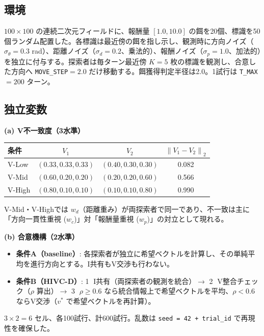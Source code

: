 \documentclass[11pt]{ltjsarticle}
\newcommand{\norm}[1]{\ensuremath{\lVert #1 \rVert}}
\begin{document}
\subsection{環境}

$100\times100$ の連続二次元フィールドに、報酬量 $[1.0, 10.0]$ の餌を20個、標識を50個ランダム配置した。各標識は最近傍の餌を指し示し、観測時に方向ノイズ（$\sigma_\theta=0.3$ rad）、距離ノイズ（$\sigma_d=0.2$、乗法的）、報酬ノイズ（$\sigma_p=1.0$、加法的）を独立に付与する。探索者は毎ターン最近傍 $K=5$ 枚の標識を観測し、合意した方向へ \texttt{MOVE\_STEP}$=2.0$ だけ移動する。餌獲得判定半径は2.0。1試行は \texttt{T\_MAX}$=200$ ターン。

\subsection{独立変数}

\textbf{(a) V不一致度（3水準）}

\begin{longtable}{@{}l c c c@{}}
\toprule
条件 & $V_1$ & $V_2$ & $\norm{V_1-V_2}_2$ \\
\midrule
V-Low  & $(0.33, 0.33, 0.33)$ & $(0.40, 0.30, 0.30)$ & 0.082 \\
V-Mid  & $(0.60, 0.20, 0.20)$ & $(0.20, 0.20, 0.60)$ & 0.566 \\
V-High & $(0.80, 0.10, 0.10)$ & $(0.10, 0.10, 0.80)$ & 0.990 \\
\bottomrule
\end{longtable}

V-Mid・V-Highでは $w_d$（距離重み）が両探索者で同一であり、不一致は主に「方向一貫性重視 ($w_c$)」対「報酬量重視 ($w_p$)」の対立として現れる。

\textbf{(b) 合意機構（2水準）}

\begin{itemize}[nosep]
  \item \textbf{条件A（baseline）}: 各探索者が独立に希望ベクトルを計算し、その単純平均を進行方向とする。I共有もV交渉も行わない。
  \item \textbf{条件B（HIVC-D）}: \textcircled{1} I共有（両探索者の観測を統合）$\to$ \textcircled{2} V整合チェック（$\rho$ 算出）$\to$ \textcircled{3} $\rho\ge0.6$ なら統合情報上で希望ベクトルを平均、$\rho<0.6$ ならV交渉（$v^*$ で希望ベクトルを再計算）。
\end{itemize}

$3\times2=6$ セル、各100試行、計600試行。乱数は \texttt{seed = 42 + trial\_id} で再現性を確保した。
\end{document}
